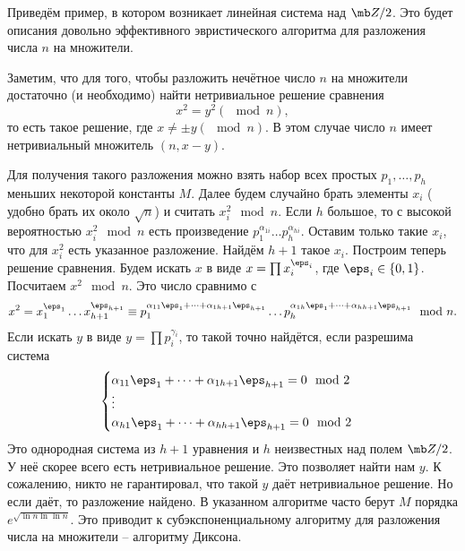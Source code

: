 Приведём пример, в котором возникает линейная система над $\mb Z/2$. Это будет описания довольно эффективного эвристического алгоритма для разложения числа $n$ на множители. 

Заметим, что для того, чтобы разложить нечётное число $n$ на множители достаточно (и необходимо) найти нетривиальное решение сравнения $$x^2=y^2(\mod n),$$
то есть такое решение, где $x\neq \pm y (\mod n)$. В этом случае число $n$ имеет нетривиальный множитель $(n,x-y)$.

Для получения такого разложения можно взять набор всех простых $p_1,\dots,p_h$ меньших некоторой константы $M$. Далее будем случайно брать элементы $x_i$ ( удобно брать их около $\sqrt{n}$) и считать  $x_i^2 \mod n$. Если $h$ большое, то с высокой вероятностью $x_i^2\mod  n$ есть произведение $p_1^{\alpha_{1i}}\dots p_h^{\alpha_{hi}}$. Оставим только такие $x_i$, что для $x_i^2$ есть указанное разложение. Найдём $h+1$ такое $x_i$. Построим теперь решение сравнения. Будем искать $x$ в виде $x=\prod x_i^{\eps_i}$, где $\eps_i \in \{0,1\}$. Посчитаем $x^2 \mod n$. Это число сравнимо с 
$$x^2 =x_1^{\eps_1}\dots x_{h+1}^{\eps_{h+1}} \equiv p_1^{\alpha_{11}\eps_1 +\dots+\alpha_{1h+1}\eps_{h+1}} \dots p_h^{\alpha_{1h}\eps_1 +\dots+\alpha_{h h+1}\eps_{h+1}} \mod n.$$
Если искать $y$ в виде $y=\prod p_i^{\gamma_i}$, то такой точно найдётся, если разрешима система
$$\begin{cases}
\alpha_{11} \eps_1+\dots+\alpha_{1h+1}\eps_{h+1}=0 \mod 2 \\
\vdots\\
\alpha_{h1} \eps_1+\dots+\alpha_{hh+1}\eps_{h+1}=0 \mod 2
\end{cases}$$
Это однородная система из $h+1$ уравнения и $h$ неизвестных над полем $\mb Z/2$. У неё скорее всего есть нетривиальное решение. Это позволяет найти нам $y$. К сожалению, никто не гарантировал, что такой $y$ даёт нетривиальное решение. Но если даёт, то разложение найдено. В указанном алгоритме часто берут $M$ порядка $e^{\sqrt{\ln n \ln\ln n}}$. Это приводит к субэкспоненциальному алгоритму для разложения числа на множители -- алгоритму Диксона.

